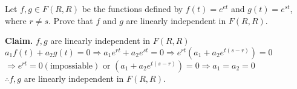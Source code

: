 Let $f,g \in F(R,R)$ be the functions defined by $f(t) = e^{et}$ and $g(t) = e^{st}$, where $r \neq s$. Prove that $f$ and $g$ are linearly independent in $F(R,R)$.

\begin{tcolorbox}
	\begin{solution}
		\textbf{Claim.} $f, g$ are linearly independent in $F(R,R)$\\
		$a_1f(t) + a_2g(t) = 0 \Rightarrow a_1e^{rt} + a_2e^{st} = 0 \Rightarrow e^{rt}(a_1 + a_2e^{t(s-r)}) = 0$\\
		$\Rightarrow e^{rt} = 0(\text{impossiable})$ or $(a_1 + a_2e^{t(s-r)}) = 0 \Rightarrow a_1=a_2=0$\\
		$\therefore f,g$ are linearly independent in $F(R,R)$.
	\end{solution}
\end{tcolorbox}